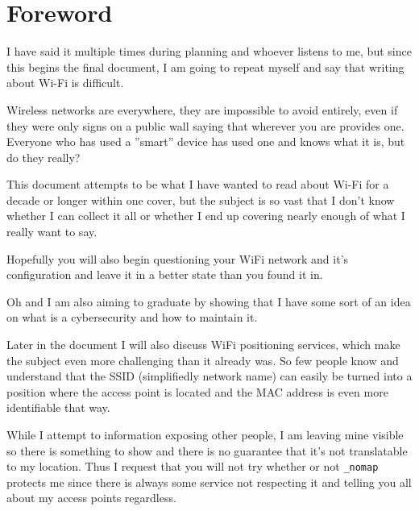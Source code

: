 \documentclass[../wifi-security.tex]{subfiles}
\begin{document}
\chapter{Foreword}

I have said it multiple times during planning and whoever listens to me, but since this begins the final document, I am going to repeat myself and say that writing about Wi-Fi is difficult.

Wireless networks are everywhere, they are impossible to avoid entirely, even if they were only signs on a public wall saying that wherever you are provides one. Everyone who has used a ''smart'' device has used one and knows what it is, but do they really?

This document attempts to be what I have wanted to read about Wi-Fi for a decade or longer within one cover, but the subject is so vast that I don't know whether I can collect it all or whether I end up covering nearly enough of what I really want to say.

Hopefully you will also begin questioning your WiFi network and it's configuration and leave it in a better state than you found it in.

Oh and I am also aiming to graduate by showing that I have some sort of an idea on what is a cybersecurity and how to maintain it.

Later in the document I will also discuss WiFi positioning services, which make the subject even more challenging than it already was. So few people know and understand that the SSID (simplifiedly network name) can easily be turned into a position where the access point is located and the MAC address is even more identifiable that way.

While I attempt to  information exposing other people, I am leaving mine visible so there is something to show and there is no guarantee that it's not translatable to my location. Thus I request that you will not try whether or not \texttt{\_nomap} protects me since there is always some service not respecting it and telling you all about my access points regardless.
\end{document}
